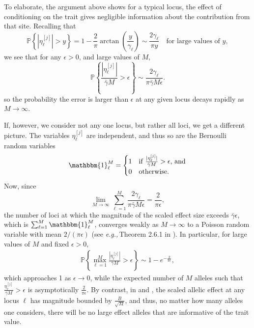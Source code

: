 \documentclass{article}
\renewcommand{\P}{\mathbb{P}}
\newcommand{\eg}{\textit{e.g.,}\,}
\newcommand{\1}{\mathbbm{1}}
\theoremstyle{remark}
\theoremstyle{definition}
\begin{document}
To elaborate, the argument above shows for a typical locus, the effect of conditioning on the trait gives negligible information about the contribution from that site.   Recalling that
\[
    \P\left\{|\eta^{[j]}_{\ell}| > y\right\} =  1-\frac{2}{\pi} \arctan\left(\frac{y}{\gamma_{\ell}}\right) \sim \frac{2\gamma_{\ell}}{\pi y} \quad \text{for large values of $y$},
\]
we see that for any $\epsilon > 0$, and large values of $M$,
\[
    \P\left\{\frac{|\eta^{[j]}_{\ell}|}{\bar{\gamma} M} > \epsilon\right\} \sim \frac{2\gamma_{\ell}}{\pi \bar{\gamma} M \epsilon}.
\]
so the probability the error is larger than $\epsilon$ at any given locus decays rapidly as $M \to \infty$.

If, however, we consider not any one locus, but rather all loci, we get a different picture. 
The variables $\eta^{[j]}_{\ell}$ are independent, and thus so are the Bernoulli random variables 
\begin{equation}
	\1^{M}_{\ell} = \begin{cases}
        1 & \text{if $\frac{|\eta^{[j]}_{\ell}|}{\bar{\gamma} M} > \epsilon$, and}\\
		0 & \text{otherwise.}
	\end{cases}
\end{equation}
Now, since
\[
	\lim_{M \to \infty} \sum_{\ell = 1}^{M} \frac{2 \gamma_{\ell}}{\pi \bar{\gamma} M \epsilon} = \frac{2}{\pi \epsilon},
\]
the number of loci at which the magnitude of the scaled effect size exceeds $\bar{\gamma} \epsilon$, which is 
$\sum_{\ell = 1}^{M} \1^{M}_{\ell}$,
converges weakly as $M \to \infty$ to a Poisson random variable with mean $2/(\pi \epsilon)$ (see \eg Theorem 2.6.1 in \cite{Durrett2005}).  In particular, for large values of $M$ and fixed $\epsilon > 0$,
\begin{align*}
    \P\left\{\max_{\ell=1}^{M} \frac{|\eta^{[j]}_{\ell}|}{\bar{\gamma} M} > \epsilon\right\}  \sim 1-e^{-\frac{2}{\pi \epsilon}},
\end{align*}
which approaches 1 as $\epsilon \to 0$, while the expected number of $M$ alleles such that $\frac{\eta^{[j]}_{\ell}}{\bar{\gamma} M} > \epsilon$ is asymptotically $\frac{2}{\pi\epsilon}$. 
By contrast, in \citet{fisher1918correlation} and \citet{barton2017infinitesimal} , the scaled allelic effect at any locus $\ell$ has magnitude bounded by $\frac{B}{\sqrt{M}}$, and thus, no matter how many alleles one considers, there will be no large effect alleles that are informative of the trait value.  
\end{document}
